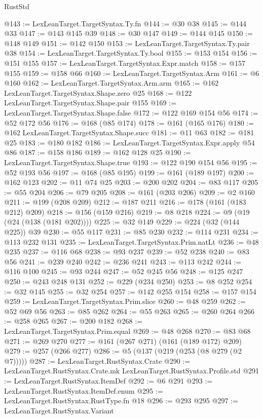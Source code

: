 \begin{lexlean}{RustStd}
\begin{coremodule}
{\begin{coremodule}
{{{{{{{{@143 := LexLeanTarget.TargetSyntax.Ty.fn
@144 := @30 @38
@145 := @144 @33
@147 := @143 @145 @39
@148 := @30 @147
@149 := @144 @145
@150 := @148 @149
@151 := @142 @150
@153 := LexLeanTarget.TargetSyntax.Ty.pair @38
@154 := LexLeanTarget.TargetSyntax.Ty.bool
@155 := @153 @154
@156 := @151 @155
@157 := LexLeanTarget.TargetSyntax.Expr.match
@158 := @157 @155
@159 := @158 @66
@160 := LexLeanTarget.TargetSyntax.Arm
@161 := @6 @160
@162 := LexLeanTarget.TargetSyntax.Arm.arm
@165 := @162 LexLeanTarget.TargetSyntax.Shape.zero @25
@168 := @122 LexLeanTarget.TargetSyntax.Shape.pair @155
@169 := LexLeanTarget.TargetSyntax.Shape.false
@172 := @122 @169 @154 @56
@174 := @52 @172 @56
@176 := @168 (@85 @174)
@178 := @161 (@165 @176)
@180 := @162 LexLeanTarget.TargetSyntax.Shape.succ
@181 := @11 @63
@182 := @181 @25
@183 := @180 @182
@186 := LexLeanTarget.TargetSyntax.Expr.apply @54 @86
@187 := @158 @186
@189 := @162 @128 @25
@190 := LexLeanTarget.TargetSyntax.Shape.true
@193 := @122 @190 @154 @56
@195 := @52 @193 @56
@197 := @168 (@85 @195)
@199 := @161 (@189 @197)
@200 := @162 @123
@202 := @11 @74 @25
@203 := @200 @202
@204 := @83 @117
@205 := @55 @204
@206 := @79 @205
@208 := @161 (@203 @206)
@209 := @2 @160
@211 := @199 (@208 @209)
@212 := @187 @211
@216 := @178 (@161 (@183 @212) @209)
@218 := @156 (@159 @216)
@219 := @8 @218
@224 := @9 (@19 (@24 (@138 (@181 @202))))
@225 := @32 @149
@229 := @224 (@32 (@144 @225)) @39
@230 := @55 @117
@231 := @85 @230
@232 := @114 @231
@234 := @113 @232 @131
@235 := LexLeanTarget.TargetSyntax.Prim.natLt
@236 := @48 @235
@237 := @116 @68
@238 := @93 @237
@239 := @52 @238
@240 := @83 @56
@241 := @239 @240
@242 := @236 @241
@243 := @113 @242
@244 := @116 @100
@245 := @93 @244
@247 := @52 @245 @56
@248 := @125 @247
@250 := @243 @248 @131
@252 := @229 (@234 @250)
@253 := @8 @252
@254 := @32 @145
@255 := @32 @254
@257 := @142 @255 @154
@258 := @157 @154
@259 := LexLeanTarget.TargetSyntax.Prim.slice
@260 := @48 @259
@262 := @52 @69 @56
@263 := @85 @262
@264 := @55 @263
@265 := @260 @264
@266 := @258 @265
@267 := @200 @182
@268 := LexLeanTarget.TargetSyntax.Prim.equal
@269 := @48 @268
@270 := @83 @68
@271 := @269 @270
@277 := @161 (@267 @271) (@161 (@189 @172) @209)
@279 := @257 (@266 @277)
@286 := @5 (@137 (@219 (@253 (@8 @279 (@2 @7)))))
@287 := LexLeanTarget.RustSyntax.Crate
@290 := LexLeanTarget.RustSyntax.Crate.mk LexLeanTarget.RustSyntax.Profile.std
@291 := LexLeanTarget.RustSyntax.ItemDef
@292 := @6 @291
@293 := LexLeanTarget.RustSyntax.ItemDef.enum
@295 := LexLeanTarget.RustSyntax.RustType.fn @18
@296 := @293 @295
@297 := LexLeanTarget.RustSyntax.Variant
}}}}}}}}
\end{coremodule}}
\end{coremodule}
\end{lexlean}
